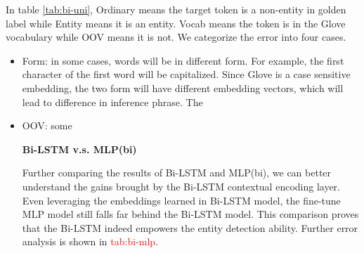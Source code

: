 \documentclass{article}
\newcommand{\red}[1]{\textcolor{red}{#1}}
\begin{document}
In table \ref{tab:bi-uni}, Ordinary means the target token is a non-entity in golden label while Entity means it is an entity. Vocab means the token is in the Glove vocabulary while OOV means it is not. We categorize the error into four cases. 
\begin{itemize}
	\item Form: in some cases, words will be in different form. For example, the first character of the first word will be capitalized. Since Glove is a case sensitive embedding, the two form will have different embedding vectors, which will lead to difference in inference phrase. The 
	\item OOV: some 



\noindent \textbf{Bi-LSTM v.s. MLP(bi)}

Further comparing the results of Bi-LSTM and MLP(bi), we can better understand the gains brought by the Bi-LSTM contextual encoding layer. Even leveraging the embeddings learned in Bi-LSTM model, the fine-tune MLP model still falls far behind the Bi-LSTM model. This comparison proves that the Bi-LSTM indeed empowers the entity detection ability. Further error analysis is shown in \red{tab:bi-mlp}.

\begin{table}[t]
\centering\centering{}
\label{tab:bi-mlp}
\caption{Statistic of Bi-LSTM and MLP comparison.}
\end{table}





\end{itemize}
\end{document}
